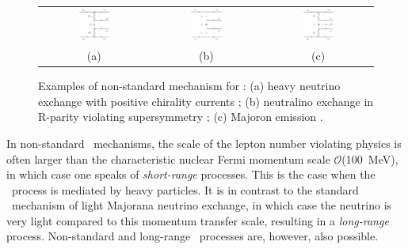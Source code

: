 \begin{figure}[t!b!]
\begin{center}
\begin{tabular}{ccc}
\includegraphics[width=0.30\textwidth]{img/FD_heavyNR_LR.eps} &
\includegraphics[width=0.30\textwidth]{img/FD_RPV_1a.eps} &
\includegraphics[width=0.30\textwidth]{img/FD_Majoron.eps} \\
(a) & (b) & (c) \\
\end{tabular}
\end{center}
\caption{\label{fig:nonstandardmechanisms}Examples of non-standard mechanism for \bbonu: (a) heavy neutrino exchange with positive chirality currents \cite{Mohapatra:1986pj}; (b) neutralino exchange in R-parity violating supersymmetry \cite{Mohapatra:1986su}; (c) Majoron emission \cite{Georgi:1981pg}.}   
\end{figure}
%
In non-standard \bbonu\ mechanisms, the scale of the lepton number violating physics is often larger than the characteristic nuclear Fermi momentum scale $\mathcal{O}$(100~MeV), in which case one speaks of \emph{short-range} processes. This is the case when the \bbonu\ process is mediated by heavy particles. It is in contrast to the standard \bbonu\ mechanism of light Majorana neutrino exchange, in which case the neutrino is very light compared to this momentum transfer scale, resulting in a \emph{long-range} process. Non-standard and long-range \bbonu\ processes are, however, also possible.

